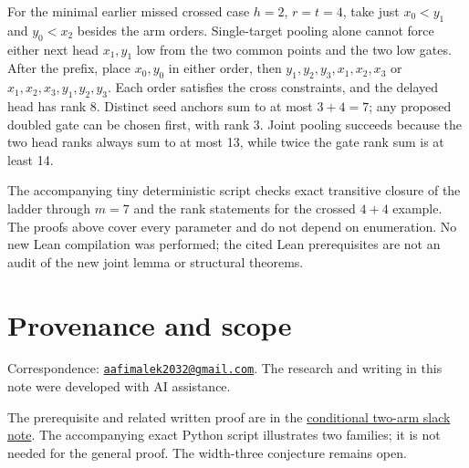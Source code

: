\documentclass[
  11pt,
]{article}
\begin{document}
For the minimal earlier missed crossed case \(h=2\), \(r=t=4\), take
just \(x_0<y_1\) and \(y_0<x_2\) besides the arm orders. Single-target
pooling alone cannot force either next head \(x_1,y_1\) low from the two
common points and the two low gates. After the prefix, place \(x_0,y_0\)
in either order, then \(y_1,y_2,y_3,x_1,x_2,x_3\) or
\(x_1,x_2,x_3,y_1,y_2,y_3\). Each order satisfies the cross constraints,
and the delayed head has rank 8. Distinct seed anchors sum to at most
\(3+4=7\); any proposed doubled gate can be chosen first, with rank 3.
Joint pooling succeeds because the two head ranks always sum to at most
13, while twice the gate rank sum is at least 14.

The accompanying tiny deterministic script checks exact transitive
closure of the ladder through \(m=7\) and the rank statements for the
crossed \(4+4\) example. The proofs above cover every parameter and do
not depend on enumeration. No new Lean compilation was performed; the
cited Lean prerequisites are not an audit of the new joint lemma or
structural theorems.

\section{Provenance and scope}\label{provenance-and-scope}

Correspondence:
\href{mailto:aafimalek2032@gmail.com}{\nolinkurl{aafimalek2032@gmail.com}}.
The research and writing in this note were developed with AI assistance.

The prerequisite and related written proof are in the
\href{https://github.com/Aafimalek/novel-discoveries/tree/6add80bc727aef16d920be7ce39d8312fed99a87/width-three-posets/verification/conditional-xyz-two-arm-slack}{conditional
two-arm slack note}. The accompanying exact Python script illustrates
two families; it is not needed for the general proof. The width-three
conjecture remains open.
\end{document}
